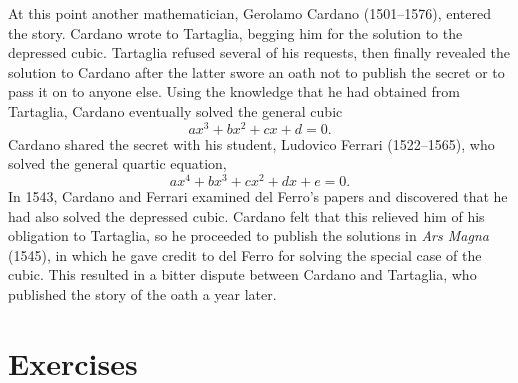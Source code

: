 {At this point another mathematician, Gerolamo Cardano (1501--1576), entered the story.  Cardano wrote to Tartaglia, begging him for the solution to the depressed cubic.  Tartaglia refused several of his requests, then finally revealed the solution to Cardano after the latter swore an oath not to publish the secret or to pass it on to anyone else. Using the knowledge that he had obtained from Tartaglia, Cardano eventually solved the general cubic 
$$
a x^3 + bx^2 +cx +d = 0.
$$
Cardano shared the secret with his student, Ludovico Ferrari (1522--1565), who solved the general quartic equation, 
$$
a x^4 + b x^3 + cx^2 + d x + e =0.
$$
In 1543, Cardano and Ferrari examined del Ferro's papers and discovered that he had also solved the depressed cubic.  Cardano felt that this relieved him of his obligation to Tartaglia, so he proceeded to publish the solutions in {\it Ars Magna} (1545), in which he gave credit to del Ferro for solving the special case of the cubic.  This resulted in a bitter dispute between Cardano and Tartaglia, who published the story of the oath a year later.
\histbox
} 
 

\section*{Exercises}
\exrule


